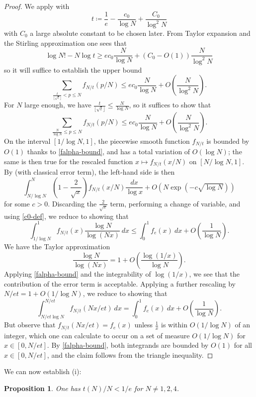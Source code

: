 \documentclass[12pt,a4paper,reqno]{amsart}
\numberwithin{equation}{section}
\theoremstyle{plain}
\newtheorem{proposition}[theorem]{Proposition}
\theoremstyle{definition}
\begin{document}
    \begin{proof}  We apply  with
      $$ t \coloneqq \frac{1}{e} - \frac{c_0}{\log N} + \frac{C_0}{\log^2 N}$$
    with $C_0$ a large absolute constant to be chosen later.  From Taylor expansion and the Stirling approximation one sees that
    $$ \log N! - N \log t \geq ec_0 \frac{N}{\log N} + (C_0-O(1)) \frac{N}{\log^2 N}$$
    so it will suffice to establish the upper bound
    $$ \sum_{\frac{t}{\lfloor\sqrt{t}\rfloor} < p \leq N} f_{N/t}(p/N) \leq ec_0 \frac{N}{\log N} + O\left( \frac{N}{\log^2 N} \right).$$
    For $N$ large enough, we have $\frac{t}{\lfloor\sqrt{t}\rfloor} \leq \frac{N}{\log N}$, so it suffices to show that
    $$ \sum_{\frac{N}{\log N} \leq p \leq N} f_{N/t}(p/N) \leq ec_0 \frac{N}{\log N} + O\left( \frac{N}{\log^2 N} \right).$$
    On the interval $[1/\log N,1]$, the piecewise smooth function $f_{N/t}$ is bounded by $O(1)$ thanks to \eqref{falpha-bound}, and has a total variation of $O(\log N)$; the same is then true for the rescaled function $x \mapsto f_{N/t}(x/N)$ on $[N/\log N,1]$.  By  (with classical error term), the left-hand side is then
    $$ \int_{N/\log N}^N \left(1-\frac{2}{\sqrt{x}}\right) f_{N/t}(x/N) \frac{dx}{\log x} + O\left( N \exp(-c\sqrt{\log N}) \right)$$
    for some $c>0$.  Discarding the $\frac{2}{\sqrt{x}}$ term, performing a change of variable, and using \eqref{c0-def}, we reduce to showing that
    $$  \int_{1/\log N}^1 f_{N/t}(x) \frac{\log N}{\log(Nx)}\ dx 
    \leq  \int_0^1 f_e(x)\ dx  + O\left( \frac{1}{\log N} \right).$$
    We have the Taylor approximation 
    $$\frac{\log N}{\log(Nx)} = 1 + O\left( \frac{\log(1/x)}{\log N} \right).$$ 
    Applying \eqref{falpha-bound} and the integrability of $\log(1/x)$, we see that the contribution of the error term is acceptable.  Applying a further rescaling by $N/et = 1 + O(1/\log N)$, we reduce to showing that
$$ \int_{N/et\log N}^{N/et} f_{N/t}(Nx/et)\ dx = \int_0^1 f_e(x)\ dx  + O\left( \frac{1}{\log N} \right).$$
But observe that $f_{N/t}(Nx/et) = f_e(x)$ unless $\frac{1}{x}$ is within $O(1/\log N)$ of an integer, which one can calculate to occur on a set of measure $O(1/\log N)$ for $x \in [0,N/et]$.  By \eqref{falpha-bound}, both integrands are bounded by $O(1)$ for all $x \in [0,N/et]$, and the claim follows from the triangle inequality.
\end{proof}
    
We can now establish (i): 

\begin{proposition}\label{tne} One has $t(N)/N < 1/e$ for $N \neq 1,2,4$.
\end{proposition}
\end{document}
